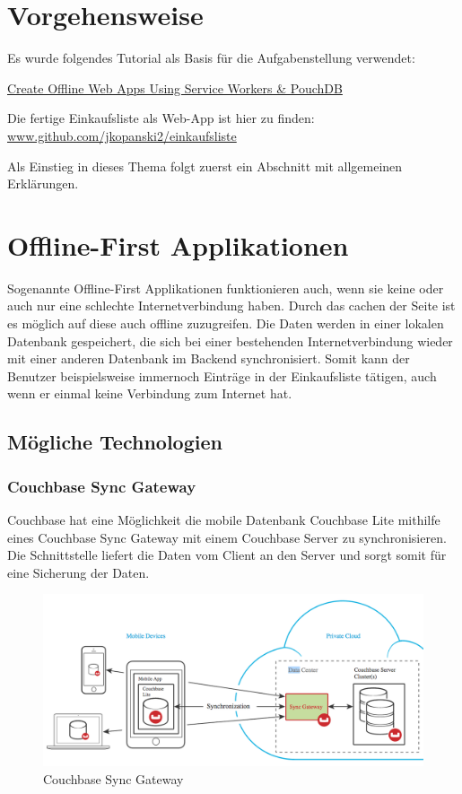 \section{Vorgehensweise}
Es wurde folgendes Tutorial\cite{tutorial} als Basis für die Aufgabenstellung verwendet:

\href{https://www.sitepoint.com/offline-web-apps-service-workers-pouchdb/}{Create Offline Web Apps Using Service Workers \& PouchDB}

Die fertige Einkaufsliste als Web-App ist hier zu finden: \url{www.github.com/jkopanski2/einkaufsliste}

Als Einstieg in dieses Thema folgt zuerst ein Abschnitt mit allgemeinen Erklärungen.

\section{Offline-First Applikationen}

Sogenannte Offline-First\cite{offlinefirst} Applikationen funktionieren auch, wenn sie keine oder auch nur eine schlechte Internetverbindung haben. Durch das cachen der Seite ist es möglich auf diese auch offline zuzugreifen. Die Daten werden in einer lokalen Datenbank gespeichert, die sich bei einer bestehenden Internetverbindung wieder mit einer anderen Datenbank im Backend synchronisiert. \cite{offlinefirstarticle} Somit kann der Benutzer beispielsweise immernoch Einträge in der Einkaufsliste tätigen, auch wenn er einmal keine Verbindung zum Internet hat.  

\subsection{Mögliche Technologien}
\subsubsection{Couchbase Sync Gateway}
Couchbase hat eine Möglichkeit die mobile Datenbank Couchbase Lite mithilfe eines Couchbase Sync Gateway mit einem Couchbase Server zu synchronisieren. Die Schnittstelle liefert die Daten vom Client an den Server und sorgt somit für eine Sicherung der Daten.

\begin{figure}[!h]
  \begin{center}
    \includegraphics[width=0.7\linewidth]{images/sync_gateway.png}
     \caption{Couchbase Sync Gateway\cite{syncgateway}}
    \label{broker}
  \end{center}
\end{figure}

